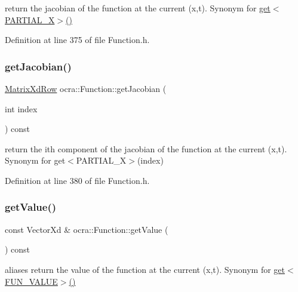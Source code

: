 return the jacobian of the function at the current (x,t). Synonym for \hyperlink{classocra_1_1Function_a244404069d9ab169fbb23309785693b8}{get$<$\+P\+A\+R\+T\+I\+A\+L\+\_\+\+X$>$()} 

Definition at line 375 of file Function.\+h.

\hypertarget{classocra_1_1Function_a1e0bdc0fd8b5aa7e7a29076858a5d28c}{}\label{classocra_1_1Function_a1e0bdc0fd8b5aa7e7a29076858a5d28c} 
\subsubsection{\texorpdfstring{get\+Jacobian()}{getJacobian()}\hspace{0.1cm}{\footnotesize\ttfamily [2/2]}}
{\footnotesize\ttfamily \hyperlink{namespaceocra_a608bf0522317ed1df3bbfc6a5753bc01}{Matrix\+Xd\+Row} ocra\+::\+Function\+::get\+Jacobian (\begin{DoxyParamCaption}\item[{int}]{index }\end{DoxyParamCaption}) const\hspace{0.3cm}{\ttfamily [inline]}}

return the ith component of the jacobian of the function at the current (x,t). Synonym for get$<$\+P\+A\+R\+T\+I\+A\+L\+\_\+\+X$>$(index) 

Definition at line 380 of file Function.\+h.

\hypertarget{classocra_1_1Function_a0b8c9f91088218ca55e73679e8c56e87}{}\label{classocra_1_1Function_a0b8c9f91088218ca55e73679e8c56e87} 
\subsubsection{\texorpdfstring{get\+Value()}{getValue()}\hspace{0.1cm}{\footnotesize\ttfamily [1/2]}}
{\footnotesize\ttfamily const Vector\+Xd \& ocra\+::\+Function\+::get\+Value (\begin{DoxyParamCaption}{ }\end{DoxyParamCaption}) const\hspace{0.3cm}{\ttfamily [inline]}}

aliases return the value of the function at the current (x,t). Synonym for \hyperlink{classocra_1_1Function_a244404069d9ab169fbb23309785693b8}{get$<$\+F\+U\+N\+\_\+\+V\+A\+L\+U\+E$>$()} 

